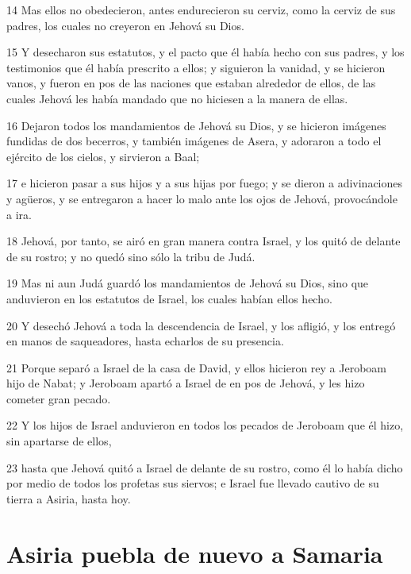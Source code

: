 \par 14 Mas ellos no obedecieron, antes endurecieron su cerviz, como la cerviz de sus padres, los cuales no creyeron en Jehová su Dios.
\par 15 Y desecharon sus estatutos, y el pacto que él había hecho con sus padres, y los testimonios que él había prescrito a ellos; y siguieron la vanidad, y se hicieron vanos, y fueron en pos de las naciones que estaban alrededor de ellos, de las cuales Jehová les había mandado que no hiciesen a la manera de ellas.
\par 16 Dejaron todos los mandamientos de Jehová su Dios, y se hicieron imágenes fundidas de dos becerros, y también imágenes de Asera, y adoraron a todo el ejército de los cielos, y sirvieron a Baal;
\par 17 e hicieron pasar a sus hijos y a sus hijas por fuego; y se dieron a adivinaciones y agüeros, y se entregaron a hacer lo malo ante los ojos de Jehová, provocándole a ira.
\par 18 Jehová, por tanto, se airó en gran manera contra Israel, y los quitó de delante de su rostro; y no quedó sino sólo la tribu de Judá.
\par 19 Mas ni aun Judá guardó los mandamientos de Jehová su Dios, sino que anduvieron en los estatutos de Israel, los cuales habían ellos hecho.
\par 20 Y desechó Jehová a toda la descendencia de Israel, y los afligió, y los entregó en manos de saqueadores, hasta echarlos de su presencia.
\par 21 Porque separó a Israel de la casa de David, y ellos hicieron rey a Jeroboam hijo de Nabat; y Jeroboam apartó a Israel de en pos de Jehová, y les hizo cometer gran pecado.
\par 22 Y los hijos de Israel anduvieron en todos los pecados de Jeroboam que él hizo, sin apartarse de ellos,
\par 23 hasta que Jehová quitó a Israel de delante de su rostro, como él lo había dicho por medio de todos los profetas sus siervos; e Israel fue llevado cautivo de su tierra a Asiria, hasta hoy.

\section*{Asiria puebla de nuevo a Samaria}


